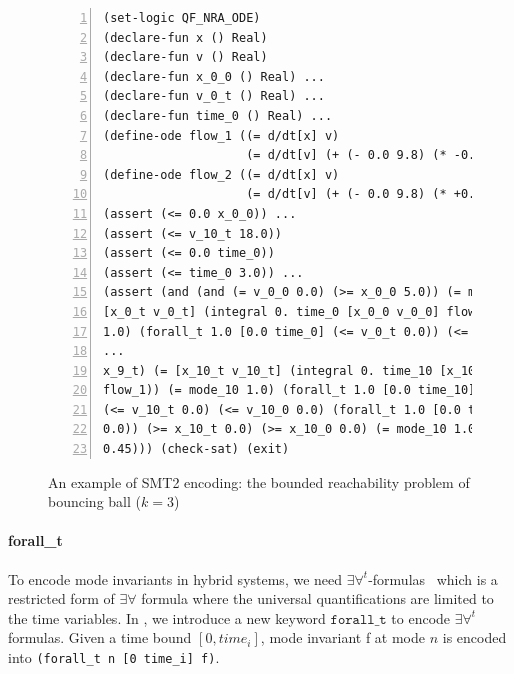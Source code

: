 \begin{figure}
  \centering
  \begin{Verbatim}[fontfamily=courier, frame=single, framesep=1mm,
  numbers=left, fontsize=\scriptsize]
(set-logic QF_NRA_ODE)
(declare-fun x () Real)
(declare-fun v () Real)
(declare-fun x_0_0 () Real) ...
(declare-fun v_0_t () Real) ...
(declare-fun time_0 () Real) ...
(define-ode flow_1 ((= d/dt[x] v)
                    (= d/dt[v] (+ (- 0.0 9.8) (* -0.45 (^ v 2.0))))))
(define-ode flow_2 ((= d/dt[x] v)
                    (= d/dt[v] (+ (- 0.0 9.8) (* +0.45 (^ v 2.0))))))
(assert (<= 0.0 x_0_0)) ...
(assert (<= v_10_t 18.0))
(assert (<= 0.0 time_0))
(assert (<= time_0 3.0)) ...
(assert (and (and (= v_0_0 0.0) (>= x_0_0 5.0)) (= mode_0 1.0) (=
[x_0_t v_0_t] (integral 0. time_0 [x_0_0 v_0_0] flow_1)) (= mode_0
1.0) (forall_t 1.0 [0.0 time_0] (<= v_0_t 0.0)) (<= v_0_t 0.0) (<=
...
x_9_t) (= [x_10_t v_10_t] (integral 0. time_10 [x_10_0 v_10_0]
flow_1)) (= mode_10 1.0) (forall_t 1.0 [0.0 time_10] (<= v_10_t 0.0))
(<= v_10_t 0.0) (<= v_10_0 0.0) (forall_t 1.0 [0.0 time_10] (>= x_10_t
0.0)) (>= x_10_t 0.0) (>= x_10_0 0.0) (= mode_10 1.0) (>= x_10_t
0.45))) (check-sat) (exit)
\end{Verbatim}
\caption{An example of SMT2 encoding: the bounded reachability problem
  of bouncing ball ($k = 3$) }
  \label{fig:bouncing-ball-smt2}
\end{figure}

\paragraph{forall\_t} To encode mode invariants in hybrid systems, we
need $\exists\forall^t$-formulas~\cite{DBLP:conf/fmcad/GaoKC13} which
is a restricted form of $\exists\forall$ formula where the universal
quantifications are limited to the time variables. In \drh{}, we
introduce a new keyword $\texttt{forall\_t}$ to encode
$\exists\forall^t$ formulas. Given a time bound $[0, time_i]$, mode
invariant f at mode $n$ is encoded into \texttt{(forall\_t n [0
  time\_i] f)}.

